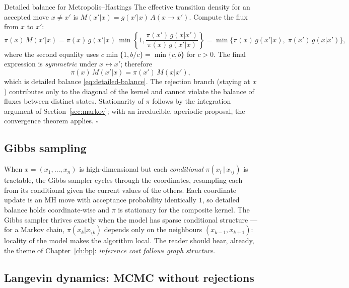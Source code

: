 \begin{toolbox}{Detailed balance for Metropolis--Hastings}
The effective transition density for an accepted move $x \neq x'$ is
$M(x'|x) = g(x'|x)\, A(x \to x')$. Compute the flux from $x$ to $x'$:
\begin{equation*}
  \pi(x)\, M(x'|x)
  = \pi(x)\, g(x'|x)\, \min\!\left\{ 1,
    \frac{\pi(x')\, g(x|x')}{\pi(x)\, g(x'|x)} \right\}
  = \min\Big\{ \pi(x)\, g(x'|x),\; \pi(x')\, g(x|x') \Big\},
\end{equation*}
where the second equality uses $c \min\{1, b/c\} = \min\{c, b\}$ for
$c > 0$. The final expression is \emph{symmetric} under
$x \leftrightarrow x'$; therefore
\begin{equation*}
  \pi(x)\, M(x'|x) = \pi(x')\, M(x|x') ,
\end{equation*}
which is detailed balance \eqref{eq:detailed-balance}. The rejection branch
(staying at $x$) contributes only to the diagonal of the kernel and cannot
violate the balance of fluxes between distinct states. Stationarity of $\pi$
follows by the integration argument of Section~\ref{sec:markov}; with an
irreducible, aperiodic proposal, the convergence theorem applies.
\hfill$\square$
\end{toolbox}

\subsection{Gibbs sampling}

When $x = (x_1, \dots, x_n)$ is high-dimensional but each \emph{conditional}
$\pi(x_i \,|\, x_{\setminus i})$ is tractable, the Gibbs sampler
\citep{geman1984stochastic} cycles through the coordinates, resampling each
from its conditional given the current values of the others. Each coordinate
update is an MH move with acceptance probability identically $1$, so detailed
balance holds coordinate-wise and $\pi$ is stationary for the composite
kernel. The Gibbs sampler thrives exactly when the model has sparse
conditional structure --- for a Markov chain,
$\pi(x_k | x_{\setminus k})$ depends only on the neighbours $(x_{k-1},
x_{k+1})$: locality of the model makes the algorithm local. The reader
should hear, already, the theme of Chapter~\ref{ch:bp}: \emph{inference cost
follows graph structure}.

\subsection{Langevin dynamics: MCMC without rejections}

